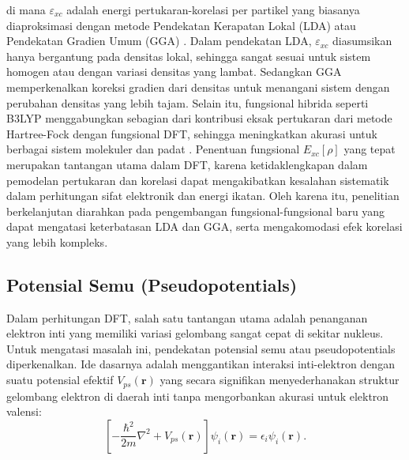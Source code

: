 di mana \(\varepsilon_{xc}\) adalah energi pertukaran-korelasi per partikel yang biasanya diaproksimasi dengan metode Pendekatan Kerapatan Lokal (LDA) atau Pendekatan Gradien Umum (GGA) \citep{Perdew1996}. Dalam pendekatan LDA, \(\varepsilon_{xc}\) diasumsikan hanya bergantung pada densitas lokal, sehingga sangat sesuai untuk sistem homogen atau dengan variasi densitas yang lambat. Sedangkan GGA memperkenalkan koreksi gradien dari densitas untuk menangani sistem dengan perubahan densitas yang lebih tajam. Selain itu, fungsional hibrida seperti B3LYP menggabungkan sebagian dari kontribusi eksak pertukaran dari metode Hartree-Fock dengan fungsional DFT, sehingga meningkatkan akurasi untuk berbagai sistem molekuler dan padat \citep{Becke1993}. Penentuan fungsional \(E_{xc}[\rho]\) yang tepat merupakan tantangan utama dalam DFT, karena ketidaklengkapan dalam pemodelan pertukaran dan korelasi dapat mengakibatkan kesalahan sistematik dalam perhitungan sifat elektronik dan energi ikatan. Oleh karena itu, penelitian berkelanjutan diarahkan pada pengembangan fungsional-fungsional baru yang dapat mengatasi keterbatasan LDA dan GGA, serta mengakomodasi efek korelasi yang lebih kompleks. \subsection{Potensial Semu (Pseudopotentials)}
Dalam perhitungan DFT, salah satu tantangan utama adalah penanganan elektron inti yang memiliki variasi gelombang sangat cepat di sekitar nukleus. Untuk mengatasi masalah ini, pendekatan potensial semu atau pseudopotentials diperkenalkan. Ide dasarnya adalah menggantikan interaksi inti-elektron dengan suatu potensial efektif \(V_{ps}(\mathbf{r})\) yang secara signifikan menyederhanakan struktur gelombang elektron di daerah inti tanpa mengorbankan akurasi untuk elektron valensi:
\begin{equation}
    \left[-\frac{\hbar^2}{2m}\nabla^2 + V_{ps}(\mathbf{r})\right]\psi_i(\mathbf{r}) = \epsilon_i \psi_i(\mathbf{r}).
 \end{equation}

